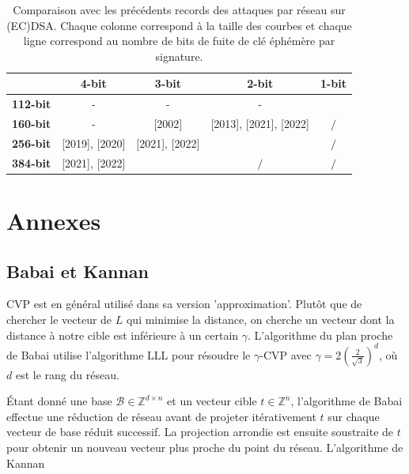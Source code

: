 \documentclass{backend}
\begin{document}
\begin{center}
    \begin{table}[H]
    \centering
    \caption{Comparaison avec les précédents records des attaques par réseau sur (EC)DSA. Chaque colonne correspond à la taille des courbes et chaque ligne correspond au nombre de bits de fuite de clé éphémère par signature.}
    \label{table:comparaison}
    \begin{tabular}{|c|c|c|c|c|}
    \hline
     & \textbf{4-bit} & \textbf{3-bit} & \textbf{2-bit} & \textbf{1-bit} \\
    \hline
    \textbf{112-bit} & - & - & - & \cite{improvedECDSA} \\
    \hline
    \textbf{160-bit} & - & [2002] & [2013], [2021], [2022] & $/$ \\
    \hline
    \textbf{256-bit} & [2019], [2020] & [2021], [2022] & \cite{improvedECDSA} & $/$ \\
    \hline
    \textbf{384-bit} & [2021], [2022] & \cite{improvedECDSA} & $/$ & $/$ \\
    \hline
    \end{tabular}
    
    \end{table}
\end{center}


\newpage
\section{Annexes}

\subsection{Babai et Kannan} \label{annexe:Babai}

CVP est en général utilisé dans sa version 'approximation'. Plutôt que de chercher le vecteur de $L$ qui minimise la distance, on cherche un vecteur dont la distance à notre cible est inférieure à un certain $\gamma$. L'algorithme du plan proche de Babai utilise l'algorithme LLL pour résoudre le \(\gamma\)-CVP avec \(\gamma = 2\left(\frac{2}{\sqrt{3}}\right)^d\), où \(d\) est le rang du réseau.

Étant donné une base \(\mathcal{B} \in \mathbb{Z}^{d \times n}\) et un vecteur cible \(t \in \mathbb{Z}^n\), l'algorithme de Babai effectue une réduction de réseau avant de projeter itérativement \(t\) sur chaque vecteur de base réduit successif. La projection arrondie est ensuite soustraite de \(t\) pour obtenir un nouveau vecteur plus proche du point du réseau. L'algorithme de Kannan 
\end{document}

